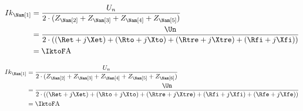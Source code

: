 {\FPeval\Ztretest{\Rfe + \Xfe + \yepET + \yepTO + \yepTRE + \yepFI}
\FPifzero{\Ztretest}
\begin{align*}
Ik_{\Nam[1]} &= \frac{U_n}{2 \cdot (Z_{\Nam[2]} + Z_{\Nam[3]} + Z_{\Nam[4]} + Z_{\Nam[5]})} \\
	&= \frac{\Un}{2 \cdot ((\Ret + j\Xet) + (\Rto + j\Xto) + (\Rtre + j\Xtre) + (\Rfi + j\Xfi))}\\
	&= \IktoF \unit{A}
\end{align*}
\else
\FPeval{}
\fi

\FPeval\all{\yepET + \yepTO + \yepTRE + \yepFI + \yepFE}
\FPifzero{\all}
\begin{align*}
Ik_{\Nam[1]} &= \frac{U_n}{2 \cdot (Z_{\Nam[2]} + Z_{\Nam[3]} + Z_{\Nam[4]} + Z_{\Nam[5]} + Z_{\Nam[6]})} \\
	&= \frac{\Un}{2 \cdot ((\Ret + j\Xet) + (\Rto + j\Xto) + (\Rtre + j\Xtre) + (\Rfi + j\Xfi) + (\Rfe + j\Xfe))}\\
	&= \IktoF \unit{A}
\end{align*}
\else
\fi
}


